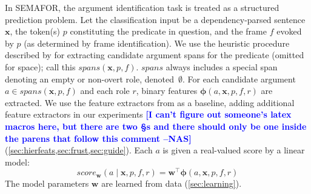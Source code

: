 \documentclass[11pt,a4paper]{article}
\newcommand{\nascomment}[1]{\textcolor{blue}{\textbf{\small [#1 --NAS]}}}
\begin{document}
In SEMAFOR, the argument identification task is treated as a structured
prediction problem.
Let the classification input be a dependency-parsed sentence $\mathbf{x}$, 
the token(s) $p$ constituting the predicate in question, and the frame $f$ evoked by $p$
(as determined by frame identification). 
We use the heuristic procedure described by \citep{das-14} for extracting candidate argument spans 
for the predicate (omitted for space); call this $\textit{spans}(\mathbf{x}, p, f)$.
$\textit{spans}$ always includes a special span denoting an empty or non-overt
role, denoted~$\emptyset$.
For each candidate argument $a \in \textit{spans}(\mathbf{x}, p, f)$
and each role
$r$, binary features $\mathbf{\phi}(a, \mathbf{x}, p, f, r)$ are extracted.
We use the feature extractors from \citep{das-14} as a baseline, adding
additional feature extractors in our experiments \nascomment{I can't
  figure out someone's latex macros here, but there are two \S s and
  there should only be one inside the parens that follow this comment}
(\cref{sec:hierfeats,sec:frust,sec:guide}).
Each $a$ is given a real-valued score by a linear model:
\begin{equation}\label{eq:score}
\textit{score}_\mathbf{w}(a \mid \mathbf{x}, p, f, r) = \mathbf{w}^\top \mathbf{\phi}(a, \mathbf{x}, p, f, r)
\end{equation}
The model parameters $\mathbf{w}$ are learned from 
data (\cref{sec:learning}).

\end{document}

